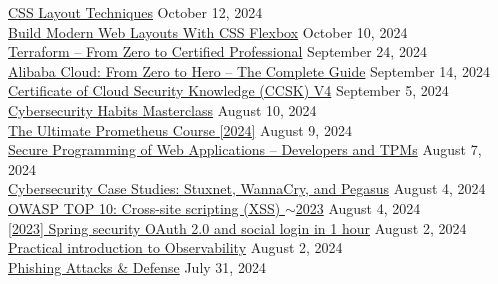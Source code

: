 \documentclass[10pt]{res} %
\begin{document}
\begin{resume}
\href{https://www.udemy.com/certificate/UC-f8d27d11-c452-4693-bd41-8289950ff3f5}{\color{blue}CSS Layout Techniques} \hfill October 12, 2024 \\
\href{https://www.udemy.com/certificate/UC-76339ef2-2ecc-4271-ba39-761513f1800f}{\color{blue}Build Modern Web Layouts With CSS Flexbox} \hfill October 10, 2024 \\
\href{https://www.udemy.com/certificate/UC-03a4594a-95d9-46ce-b128-79e5be8c66e7}{\color{blue}Terraform -- From Zero to Certified Professional} \hfill September 24, 2024 \\
\href{https://www.udemy.com/certificate/UC-5c0ae63a-63b2-4b9e-96d6-d56f7fafe460}{\color{blue}Alibaba Cloud: From Zero to Hero -- The Complete Guide} \hfill September 14, 2024 \\
\href{https://www.udemy.com/certificate/UC-0736ec28-e9f8-406d-8754-3325c5a44fec}{\color{blue}Certificate of Cloud Security Knowledge (CCSK) V4} \hfill September 5, 2024 \\
\href{https://www.udemy.com/certificate/UC-b820e074-b7e3-4a2a-99c8-4fd5b26f03d6}{\color{blue}Cybersecurity Habits Masterclass} \hfill August 10, 2024 \\
\href{https://www.udemy.com/certificate/UC-83544098-6ee9-43fe-8a3c-becb11a3b04e}{\color{blue}The Ultimate Prometheus Course [2024]} \hfill August 9, 2024 \\
\href{https://www.udemy.com/certificate/UC-7da0709f-93af-498a-a348-1731bfa4aae1}{\color{blue}Secure Programming of Web Applications -- Developers and TPMs} \hfill August 7, 2024 \\
\href{https://www.udemy.com/certificate/UC-74509b2c-1c0a-459a-be20-624dd8318541}{\color{blue}Cybersecurity Case Studies: Stuxnet, WannaCry, and Pegasus} \hfill August 4, 2024 \\
\href{https://www.udemy.com/certificate/UC-444848f0-cfdd-4a86-a40e-1178df64e01c}{\color{blue}OWASP TOP 10: Cross-site scripting (XSS) $\sim$2023} \hfill August 4, 2024 \\
\href{https://www.udemy.com/certificate/UC-a1c6ee5f-c858-45bc-95c7-e58474f2ad6f}{\color{blue}[2023] Spring security OAuth 2.0 and social login in 1 hour} \hfill August 2, 2024 \\
\href{https://www.udemy.com/certificate/UC-cf263fff-e605-4936-93ff-af109f93df9a}{\color{blue}Practical introduction to Observability} \hfill August 2, 2024 \\
\href{https://www.udemy.com/certificate/UC-0b5f2678-cff7-432c-ab16-bf5719ba069f}{\color{blue}Phishing Attacks \& Defense} \hfill July 31, 2024 \\

\end{resume}
\end{document}
